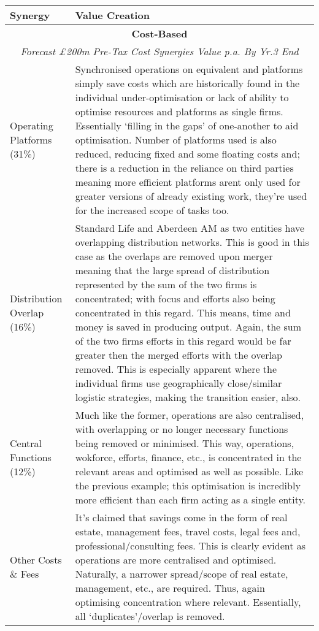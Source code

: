 \documentclass[11pt, english]{article}
\begin{document}
\newpage

\begin{center}               
        \scriptsize
\begin{longtable}{p{4cm}p{8.5cm}}
        \textbf{Synergy} & \textbf{Value Creation}\\
        \hline
        \multicolumn{2}{c}{\textbf{Cost-Based}}\\
        \multicolumn{2}{c}{\textit{Forecast \pounds200m Pre-Tax Cost Synergies Value p.a. By Yr.3 End}}\\
        \hline
        Operating Platforms (31\%) & Synchronised operations on equivalent and platforms simply save costs which are historically found in the individual under-optimisation or lack of ability to optimise resources and platforms as single firms. Essentially `filling in the gaps' of one-another to aid optimisation. Number of platforms used is also reduced, reducing fixed and some floating costs and; there is a reduction in the reliance on third parties meaning more efficient platforms arent only used for greater versions of already existing work, they're used for the increased scope of tasks too.\\
        Distribution Overlap (16\%) & Standard Life and Aberdeen AM as two entities have overlapping distribution networks. This is good in this case as the overlaps are removed upon merger meaning that the large spread of distribution represented by the sum of the two firms is concentrated; with focus and efforts also being concentrated in this regard. This means, time and money is saved in producing output. Again, the sum of the two firms efforts in this regard would be far greater then the merged efforts with the overlap removed. This is especially apparent where the individual firms use geographically close/similar logistic strategies, making the transition easier, also.\\
        Central Functions (12\%) & Much like the former, operations are also centralised, with overlapping or no longer necessary functions being removed or minimised. This way, operations, wokforce, efforts, finance, etc., is concentrated in the relevant areas and optimised as well as possible. Like the previous example; this optimisation is incredibly more efficient than each firm acting as a single entity.\\
        Other Costs \& Fees & It's claimed that savings come in the form of real estate, management fees, travel costs, legal fees and, professional/consulting fees. This is clearly evident as operations are more centralised and optimised. Naturally, a narrower spread/scope of real estate, management, etc., are required. Thus, again optimising concentration where relevant. Essentially, all `duplicates'/overlap is removed.\\

\end{longtable}
\end{center}
\end{document}
